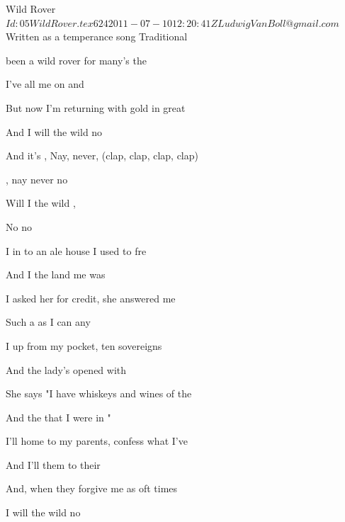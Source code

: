 \begin{SBSong}{Wild Rover}
  {$Id: 05WildRover.tex 624 2011-07-10 12:20:41Z LudwigVanBoll@gmail.com $}
  {Written as a temperance song}
  {Traditional}
  \begin{SBVerse}
     been a wild rover for many's the  

    I've  all me  on  and 
    
    But now I'm returning with gold in great 
    
    And I  will  the wild  no 
  \end{SBVerse}
  \begin{SBChorus}
    And it's , Nay, never, (clap, clap, clap, clap)
    
    , nay never no 
    
    Will I  the wild ,
    
    No  no 
  \end{SBChorus}
  \begin{SBVerse}
    I  in to an ale house I used to fre
    
    And I  the land me  was 
    
    I asked her for credit, she answered me 
    
    Such a  as  I can  any 
  \end{SBVerse}
  \begin{SBVerse}
    I  up from my pocket, ten sovereigns 
    
    And the lady's  opened  with 
    
    She says "I have whiskeys and wines of the 
    
    And the  that I  were  in "
  \end{SBVerse}
  \begin{SBVerse}
    I'll  home to my parents, confess what I've 
    
    And I'll  them to  their  
    
    And, when they forgive me as oft times 
    
    I  will  the wild  no 
  \end{SBVerse}
\end{SBSong}

